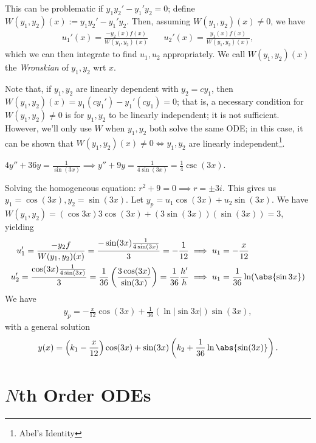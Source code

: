 This can be problematic if $y_1y_2' - y_1'y_2 = 0$; define $W(y_1, y_2)(x):= y_1y_2' - y_1'y_2$. Then, assuming $W(y_1, y_2)(x) \neq 0$, we have \begin{align*}
    u_1'(x) = \frac{-y_2(x)f(x)}{W(y_1, y_2)(x)} & \quad u_2'(x) = \frac{y_1(x)f(x)}{W(y_1, y_2)(x)},
\end{align*}
which we can then integrate to find $u_1, u_2$ appropriately. We call $W(y_1, y_2)(x)$ the \emph{Wronskian} of $y_1, y_2$ wrt $x$. 

Note that, if $y_1, y_2$ are linearly dependent with $y_2 = cy_1$, then $W(y_1, y_2)(x) = y_1(cy_1') - y_1'(cy_1) = 0$; that is, a necessary condition for $W(y_1, y_2) \neq 0$ is for $y_1, y_2$ to be linearly independent; it is not sufficient. However, we'll only use $W$ when $y_1, y_2$ both solve the same ODE; in this case, it can be shown that $W(y_1, y_2)(x) \neq 0 \iff y_1, y_2$ are linearly independent\footnote{Abel's Identity}.

\begin{example}
    $4y'' + 36 y = \frac{1}{\sin (3x)} \implies y'' + 9 y = \frac{1}{4 \sin (3x)} = \frac{1}{4} \csc (3x)$.

    Solving the homogeneous equation: $r^2 + 9 =0 \implies r = \pm 3i$. This gives us $y_1 = \cos (3x) , y_2 = \sin(3x)$. Let $y_p = u_1 \cos (3x) + u_2 \sin(3x)$. 
    We have $W(y_1, y_2) = (\cos 3x)3 \cos (3x) + (3\sin(3x))(\sin (3x)) = 3$, yielding \begin{align*}
        u_1' = \frac{-y_2f}{W(y_1, y_2)(x)} = \frac{-\sin(3x)\frac{1}{4\sin(3x)}}{3} = - \frac{1}{12} &\implies u_1 = -\frac{x}{12}\\
        u_2' = \frac{\cos(3x) \frac{1}{4\sin (3x)}}{3} = \frac{1}{36}\left(\frac{3 \cos (3x)}{\sin (3x)}\right) = \frac{1}{36}{\frac{h'}{h}} &\implies u_1 = \frac{1}{36} \ln(\abs{\sin 3x})
    \end{align*}
    We have \begin{align*}
        y_p = - \frac{x}{12} \cos(3x) + \frac{1}{36} \left(\ln |\sin 3x|\right) \sin (3x),
    \end{align*}
    with a general solution \begin{align*}
        y(x) = \left(k_1 - \frac{x}{12}\right) \cos(3x) + \sin (3x)\left(k_2 + \frac{1}{36} \ln \abs{\sin (3x)}\right).
    \end{align*}
\end{example}

\section{\texorpdfstring{$N$}{N}th Order ODEs}
